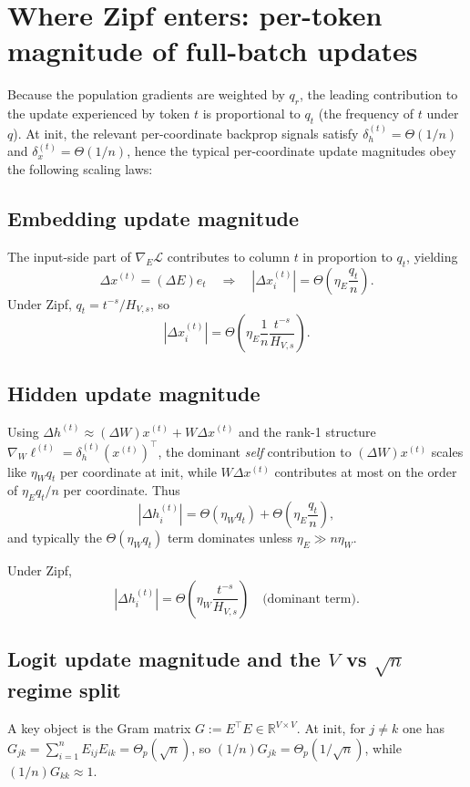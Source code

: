 \documentclass[11pt]{article}
\begin{document}
\section{Where Zipf enters: per-token magnitude of full-batch updates}

Because the population gradients are weighted by $q_r$, the leading contribution to the update experienced
by token $t$ is proportional to $q_t$ (the frequency of $t$ under $q$). At init, the relevant
per-coordinate backprop signals satisfy $\delta_h^{(t)}=\Theta(1/n)$ and $\delta_x^{(t)}=\Theta(1/n)$,
hence the typical per-coordinate update magnitudes obey the following scaling laws:

\subsection{Embedding update magnitude}
The input-side part of $\nabla_E\mathcal{L}$ contributes to column $t$ in proportion to $q_t$,
yielding
\[
\Delta x^{(t)} = (\Delta E)e_t \quad \Longrightarrow \quad
|\Delta x^{(t)}_i| = \Theta\!\left(\eta_E \frac{q_t}{n}\right).
\]
Under Zipf, $q_t = t^{-s}/H_{V,s}$, so
\[
|\Delta x^{(t)}_i| = \Theta\!\left(\eta_E \frac{1}{n}\frac{t^{-s}}{H_{V,s}}\right).
\]

\subsection{Hidden update magnitude}
Using $\Delta h^{(t)}\approx (\Delta W)x^{(t)} + W\Delta x^{(t)}$ and the rank-1 structure
$\nabla_W \ell^{(t)}=\delta_h^{(t)}(x^{(t)})^\top$, the dominant \emph{self} contribution to $(\Delta W)x^{(t)}$
scales like $\eta_W q_t$ per coordinate at init, while $W\Delta x^{(t)}$ contributes at most on the order of
$\eta_E q_t/n$ per coordinate. Thus
\[
|\Delta h^{(t)}_i| = \Theta(\eta_W q_t) + \Theta\!\left(\eta_E \frac{q_t}{n}\right),
\]
and typically the $\Theta(\eta_W q_t)$ term dominates unless $\eta_E\gg n\eta_W$.

Under Zipf,
\[
|\Delta h^{(t)}_i| = \Theta\!\left(\eta_W \frac{t^{-s}}{H_{V,s}}\right)
\quad \text{(dominant term)}.
\]

\subsection{Logit update magnitude and the $V$ vs $\sqrt{n}$ regime split}

A key object is the Gram matrix $G:=E^\top E\in\mathbb{R}^{V\times V}$.
At init, for $j\neq k$ one has $G_{jk}=\sum_{i=1}^n E_{ij}E_{ik}=\Theta_p(\sqrt{n})$,
so $(1/n)G_{jk}=\Theta_p(1/\sqrt{n})$, while $(1/n)G_{kk}\approx 1$.
\end{document}
